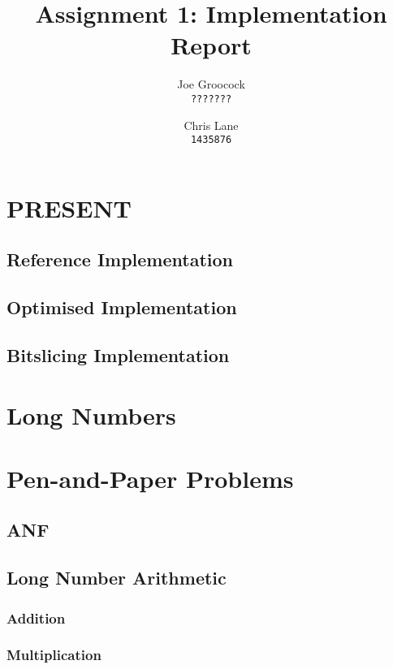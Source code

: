 \documentclass[11pt, a4paper]{article}
\title{Assignment 1: Implementation Report}
\author{Joe Groocock    \\ \texttt{\normalsize ???????}
    \and Chris Lane     \\ \texttt{\normalsize 1435876}
}
\begin{document}
\maketitle

\section{PRESENT}
\subsection{Reference Implementation}

\subsection{Optimised Implementation}




\subsection{Bitslicing Implementation}




\section{Long Numbers}

\section{Pen-and-Paper Problems}

\subsection{ANF}

\subsection{Long Number Arithmetic}

\subsubsection{Addition}

\subsubsection{Multiplication}
\end{document}
